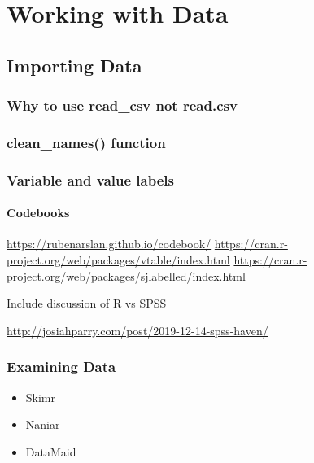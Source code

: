 \documentclass[]{book}
\providecommand{\tightlist}{%
  \setlength{\itemsep}{0pt}\setlength{\parskip}{0pt}}
\begin{document}
\hypertarget{working-with-data}{%
\chapter{Working with Data}\label{working-with-data}}

\hypertarget{importing-data}{%
\section{Importing Data}\label{importing-data}}

\hypertarget{why-to-use-read_csv-not-read.csv}{%
\subsection{Why to use read\_csv not read.csv}\label{why-to-use-read_csv-not-read.csv}}

\hypertarget{clean_names-function}{%
\subsection{clean\_names() function}\label{clean_names-function}}

\hypertarget{variable-and-value-labels}{%
\subsection{Variable and value labels}\label{variable-and-value-labels}}

\hypertarget{codebooks}{%
\subsubsection{Codebooks}\label{codebooks}}

\url{https://rubenarslan.github.io/codebook/}
\url{https://cran.r-project.org/web/packages/vtable/index.html}
\url{https://cran.r-project.org/web/packages/sjlabelled/index.html}

Include discussion of R vs SPSS

\url{http://josiahparry.com/post/2019-12-14-spss-haven/}

\hypertarget{examining-data}{%
\subsection{Examining Data}\label{examining-data}}

\begin{itemize}
\tightlist
\item
  Skimr
\item
  Naniar
\item
  DataMaid
\end{itemize}
\end{document}
